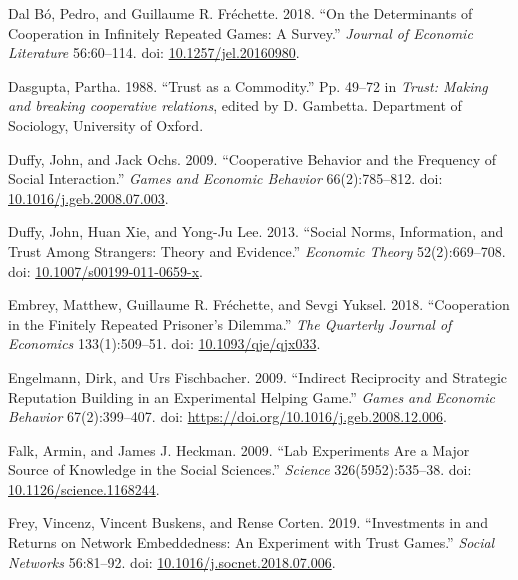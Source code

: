 \documentclass[
  11pt,
]{article}
\newlength{\cslhangindent}
\newlength{\cslentryspacingunit} %
\newenvironment{CSLReferences}[2] %
 {%
  \setlength{\parindent}{0pt}
  \ifodd #1
  \let\oldpar\par
  \def\par{\hangindent=\cslhangindent\oldpar}
  \fi
  \setlength{\parskip}{#2\cslentryspacingunit}
 }%
 {}
\begin{document}
\begin{CSLReferences}{1}{0}
\leavevmode{}%
Dal Bó, Pedro, and Guillaume R. Fréchette. 2018. {``On the Determinants of Cooperation in Infinitely Repeated Games: A Survey.''} \emph{Journal of Economic Literature} 56:60--114. doi: \href{https://doi.org/10.1257/jel.20160980}{10.1257/jel.20160980}.

\leavevmode{}%
Dasgupta, Partha. 1988. {``Trust as a Commodity.''} Pp. 49--72 in \emph{Trust: Making and breaking cooperative relations}, edited by D. Gambetta. Department of Sociology, University of Oxford.

\leavevmode{}%
Duffy, John, and Jack Ochs. 2009. {``Cooperative Behavior and the Frequency of Social Interaction.''} \emph{Games and Economic Behavior} 66(2):785--812. doi: \href{https://doi.org/10.1016/j.geb.2008.07.003}{10.1016/j.geb.2008.07.003}.

\leavevmode{}%
Duffy, John, Huan Xie, and Yong-Ju Lee. 2013. {``Social Norms, Information, and Trust Among Strangers: Theory and Evidence.''} \emph{Economic Theory} 52(2):669--708. doi: \href{https://doi.org/10.1007/s00199-011-0659-x}{10.1007/s00199-011-0659-x}.

\leavevmode{}%
Embrey, Matthew, Guillaume R. Fréchette, and Sevgi Yuksel. 2018. {``{Cooperation in the Finitely Repeated Prisoner's Dilemma}.''} \emph{The Quarterly Journal of Economics} 133(1):509--51. doi: \href{https://doi.org/10.1093/qje/qjx033}{10.1093/qje/qjx033}.

\leavevmode{}%
Engelmann, Dirk, and Urs Fischbacher. 2009. {``Indirect Reciprocity and Strategic Reputation Building in an Experimental Helping Game.''} \emph{Games and Economic Behavior} 67(2):399--407. doi: \url{https://doi.org/10.1016/j.geb.2008.12.006}.

\leavevmode{}%
Falk, Armin, and James J. Heckman. 2009. {``Lab Experiments Are a Major Source of Knowledge in the Social Sciences.''} \emph{Science} 326(5952):535--38. doi: \href{https://doi.org/10.1126/science.1168244}{10.1126/science.1168244}.

\leavevmode{}%
Frey, Vincenz, Vincent Buskens, and Rense Corten. 2019. {``Investments in and Returns on Network Embeddedness: An Experiment with Trust Games.''} \emph{Social Networks} 56:81--92. doi: \href{https://doi.org/10.1016/j.socnet.2018.07.006}{10.1016/j.socnet.2018.07.006}.


\end{CSLReferences}
\end{document}
